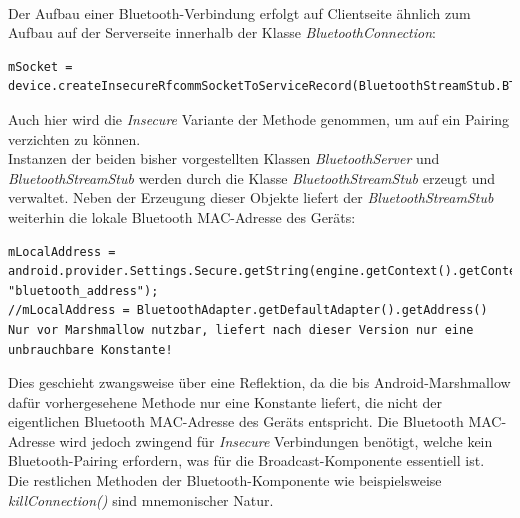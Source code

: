 \\Der Aufbau einer Bluetooth-Verbindung erfolgt auf Clientseite ähnlich zum Aufbau auf der Serverseite innerhalb der Klasse \textit{BluetoothConnection}:\newline
 \lstset{language=Java, caption=Clientseitige Initialisierung des Sockets, label=DescriptiveLabel, numbers=left, numbersep=1em, breaklines=true, basicstyle=\small}
\begin{lstlisting}
mSocket = device.createInsecureRfcommSocketToServiceRecord(BluetoothStreamStub.BT_UUID)
\end{lstlisting}
Auch hier wird die \textit{Insecure} Variante der Methode genommen, um auf ein Pairing verzichten zu können.
\\Instanzen der beiden bisher vorgestellten Klassen \textit{BluetoothServer} und \textit{BluetoothStreamStub} werden durch die Klasse \textit{BluetoothStreamStub} erzeugt und verwaltet. Neben der Erzeugung dieser Objekte liefert der \textit{BluetoothStreamStub} weiterhin die lokale Bluetooth MAC-Adresse des Geräts:\newline
\lstset{language=Java, caption=Auslesen der Bluetooth MAC-Adresse, label=DescriptiveLabel, numbers=left, numbersep=1em, breaklines=true, basicstyle=\small}
\begin{lstlisting}
mLocalAddress = android.provider.Settings.Secure.getString(engine.getContext().getContentResolver(), "bluetooth_address");
//mLocalAddress = BluetoothAdapter.getDefaultAdapter().getAddress() Nur vor Marshmallow nutzbar, liefert nach dieser Version nur eine unbrauchbare Konstante!
\end{lstlisting}
Dies geschieht zwangsweise über eine Reflektion, da die bis Android-Marshmallow dafür vorhergesehene Methode nur eine Konstante liefert, die nicht der eigentlichen Bluetooth MAC-Adresse des Geräts entspricht. Die Bluetooth MAC-Adresse wird jedoch zwingend für \textit{Insecure} Verbindungen benötigt, welche kein Bluetooth-Pairing erfordern, was für die Broadcast-Komponente essentiell ist. 
\\Die restlichen Methoden der Bluetooth-Komponente wie beispielsweise \textit{killConnection()} sind mnemonischer Natur.

